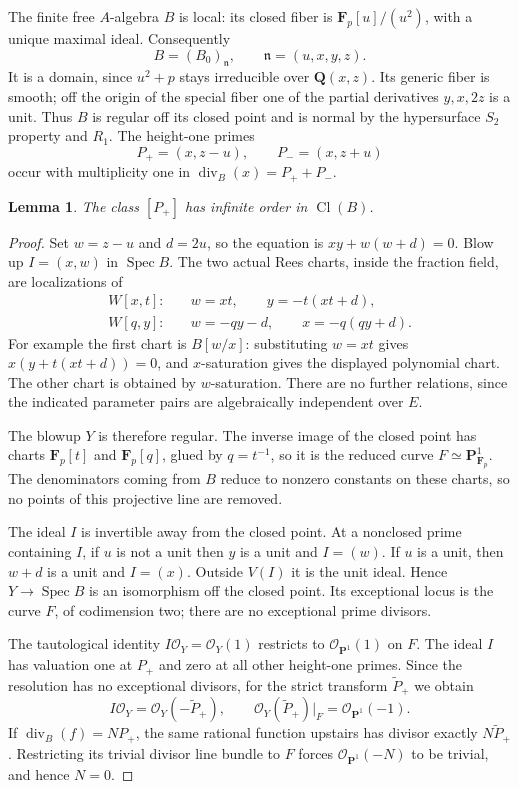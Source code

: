 \documentclass[11pt,a4paper]{article}
\newtheorem{lemma}[theorem]{Lemma}
\theoremstyle{remark}
\newcommand{\Q}{\mathbf Q}
\newcommand{\F}{\mathbf F}
\newcommand{\PP}{\mathbf P}
\newcommand{\OO}{\mathcal O}
\newcommand{\n}{\mathfrak n}
\newcommand{\Spec}{\operatorname{Spec}}
\newcommand{\Cl}{\operatorname{Cl}}
\newcommand{\divisor}{\operatorname{div}}
\begin{document}
The finite free \(A\)-algebra \(B\) is local: its closed fiber is
\(\F_p[u]/(u^2)\), with a unique maximal ideal. Consequently
\[
 B=(B_0)_{\n},\qquad \n=(u,x,y,z).
\]
It is a domain, since \(u^2+p\) stays irreducible over \(\Q(x,z)\).
Its generic fiber is smooth; off the origin of the special fiber
one of the partial derivatives \(y,x,2z\) is a unit.
Thus \(B\) is regular off its closed point and is normal by
the hypersurface \(S_2\) property and \(R_1\).
The height-one primes
\[
 P_+=(x,z-u),\qquad P_-=(x,z+u)
\]
occur with multiplicity one in \(\divisor_B(x)=P_++P_-\).

\begin{lemma}\label{lem:geometricresolution}
The class \([P_+]\) has infinite order in \(\Cl(B)\).
\end{lemma}
\begin{proof}
Set \(w=z-u\) and \(d=2u\), so the equation is
\(xy+w(w+d)=0\). Blow up \(I=(x,w)\) in \(\Spec B\).
The two actual Rees charts, inside the fraction field, are
localizations of
\begin{align*}
 W[x,t]:&\quad w=xt,\qquad y=-t(xt+d),\\
 W[q,y]:&\quad w=-qy-d,\qquad x=-q(qy+d).
\end{align*}
For example the first chart is \(B[w/x]\): substituting \(w=xt\)
gives \(x(y+t(xt+d))=0\), and \(x\)-saturation gives the displayed
polynomial chart. The other chart is obtained by \(w\)-saturation.
There are no further relations, since the indicated parameter pairs
are algebraically independent over \(E\).

The blowup \(Y\) is therefore regular. The inverse image of the
closed point has charts \(\F_p[t]\) and \(\F_p[q]\), glued by
\(q=t^{-1}\), so it is the reduced curve \(F\simeq\PP^1_{\F_p}\).
The denominators coming from \(B\) reduce to nonzero constants
on these charts, so no points of this projective line are removed.

The ideal \(I\) is invertible away from the closed point.
At a nonclosed prime containing \(I\), if \(u\) is not a unit
then \(y\) is a unit and \(I=(w)\). If \(u\) is a unit, then
\(w+d\) is a unit and \(I=(x)\). Outside \(V(I)\) it is the
unit ideal. Hence \(Y\to\Spec B\) is an isomorphism off the
closed point. Its exceptional locus is the curve \(F\), of
codimension two; there are no exceptional prime divisors.

The tautological identity \(I\OO_Y=\OO_Y(1)\)
\cite[Section~31.33]{StacksBlowup} restricts to
\(\OO_{\PP^1}(1)\) on \(F\).
The ideal \(I\) has valuation one at \(P_+\) and zero at all
other height-one primes. Since the resolution has no exceptional
divisors, for the strict transform \(\widetilde P_+\) we obtain
\[
 I\OO_Y=\OO_Y(-\widetilde P_+),\qquad
 \OO_Y(\widetilde P_+)|_F=\OO_{\PP^1}(-1).
\]
If \(\divisor_B(f)=N P_+\), the same rational function upstairs
has divisor exactly \(N\widetilde P_+\). Restricting its trivial
divisor line bundle to \(F\) forces \(\OO_{\PP^1}(-N)\) to be
trivial, and hence \(N=0\).
\end{proof}
\end{document}
